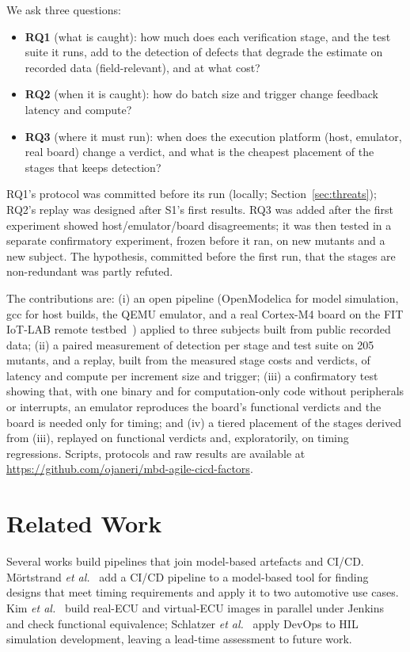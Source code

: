\documentclass[conference]{IEEEtran}
\begin{document}
We ask three questions:
\begin{itemize}
\item \textbf{RQ1} (what is caught): how much does each verification stage, and the test suite it runs,
add to the detection of defects that degrade the estimate on recorded data (field-relevant), and at what cost?
\item \textbf{RQ2} (when it is caught): how do batch size and trigger change feedback latency and
compute?
\item \textbf{RQ3} (where it must run): when does the execution platform (host, emulator, real board)
change a verdict, and what is the cheapest placement of the stages that keeps detection?
\end{itemize}
RQ1's protocol was committed before its run (locally; Section~\ref{sec:threats}); RQ2's replay was designed
after S1's first results. RQ3 was added after the first experiment showed host/emulator/board
disagreements; it was then tested in a separate confirmatory experiment, frozen before it ran, on new
mutants and a new subject. The hypothesis, committed before the first run, that the stages are
non-redundant was partly refuted.

The contributions are: (i) an open pipeline (OpenModelica for model simulation, gcc for host builds, the
QEMU emulator, and a real Cortex-M4 board on the FIT IoT-LAB remote testbed~\cite{adjih2015}) applied to three subjects built from public recorded data; (ii) a paired
measurement of detection per stage and test suite on 205 mutants, and a replay, built from the measured stage
costs and verdicts, of latency and compute per increment size and trigger; (iii) a
confirmatory test showing that, with one binary and for computation-only code without peripherals or
interrupts, an emulator reproduces the board's functional verdicts and the board is needed only for timing; and (iv) a tiered placement of the stages derived
from (iii), replayed on functional verdicts and, exploratorily, on timing regressions. Scripts, protocols and raw results are available at
\url{https://github.com/ojaneri/mbd-agile-cicd-factors}.

\section{Related Work}

Several works build pipelines that join model-based artefacts and CI/CD. M\"ortstrand \emph{et
al.}~\cite{mortstrand2023} add a CI/CD pipeline to a model-based tool for finding designs that meet timing requirements and apply it to two
automotive use cases. Kim \emph{et al.}~\cite{kim2026} build real-ECU and virtual-ECU images in
parallel under Jenkins and check functional equivalence; Schlatzer \emph{et al.}~\cite{schlatzer2025} apply
DevOps to HIL simulation development, leaving a lead-time assessment to future work.
\end{document}

